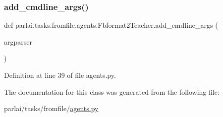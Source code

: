 \subsubsection{\texorpdfstring{add\+\_\+cmdline\+\_\+args()}{add\_cmdline\_args()}}
{\footnotesize\ttfamily def parlai.\+tasks.\+fromfile.\+agents.\+Fbformat2\+Teacher.\+add\+\_\+cmdline\+\_\+args (\begin{DoxyParamCaption}\item[{}]{argparser }\end{DoxyParamCaption})\hspace{0.3cm}{\ttfamily [static]}}



Definition at line 39 of file agents.\+py.



The documentation for this class was generated from the following file\+:\begin{DoxyCompactItemize}
\item 
parlai/tasks/fromfile/\hyperlink{parlai_2tasks_2fromfile_2agents_8py}{agents.\+py}\end{DoxyCompactItemize}

